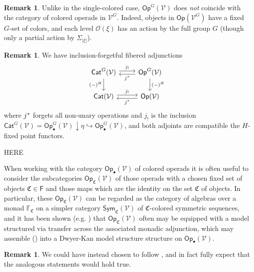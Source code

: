 \documentclass[a4paper,10pt
,draft
]{article}%
\numberwithin{equation}{section}
\numberwithin{figure}{section}
\theoremstyle{definition} %
\newtheorem{remark}[equation]{Remark}%
\newcommand{\into}{\hookrightarrow}%
\newcommand{\Cat}{\mathsf{Cat}}
\newcommand{\Op}{\mathsf{Op}}%
\newcommand{\V}{\ensuremath{\mathcal V}}
\renewcommand{\O}{\ensuremath{\mathcal O}}
\newcommand{\1}{\ensuremath{\mathbbm 1}}%
\begin{document}
\begin{remark}
      Unlike in the single-colored case, $\Op^G(\V)$ does \textit{not} coincide with the category of colored operads in $\V^G$.
      Indeed, objects in $\Op(\V^G)$ have a fixed $G$-set of colors,
      and each level $\O(\xi)$ has an action by the full group $G$
      (though only a partial action by $\Sigma_{|\xi|}$).
\end{remark}



\begin{remark}
We have inclusion-forgetful fibered adjunctions
\begin{equation}\label{JSTAR_CAT_EQ}
\begin{tikzcd}
	\Cat^{G}(\V)
	\arrow[shift left]{r}{j_!}
	\arrow[d, "{(-)^H}"']
&
	\Op^{G}(\V)
	\arrow[shift left]{l}{j^{\**}}
	\arrow{d}{(-)^H}
\\
	\Cat(\V)
	\arrow[shift left]{r}{j_!}
&
	\Op(\V)
	\arrow[shift left]{l}{j^{\**}}
\end{tikzcd}
\end{equation}
where $j^{\**}$ forgets all non-unary operations and
$j_!$ is the inclusion $\Cat^G(\V) = \Op^G_\bullet(\V) \downarrow \eta \into \Op^G_\bullet(\V)$,
and both adjoints are compatible the $H$-fixed point functors.
\end{remark}



{\color{blue} HERE}


When working with the category $\mathsf{Op}_\bullet(\mathcal{V})$ of colored operads
it is often useful to consider the subcategories $\mathsf{Op}_{\mathfrak{C}}(\mathcal{V})$
of those operads with a chosen fixed set of objects
$\mathfrak{C} \in \mathsf{F}$ and those maps which are the identity on the set $\mathfrak{C}$ of objects.
In particular, these $\mathsf{Op}_{\mathfrak{C}}(\mathcal{V})$ can be regarded as the category of algebras over a monad 
$\mathbb{F}_{\mathfrak{C}}$ on a simpler category
$\mathsf{Sym}_{\mathfrak{C}}(\mathcal{V})$ of $\mathfrak C$-colored symmetric sequences,
and it has been shown (e.g. \cite{BM07,BB17,WY18,Cav}) that
$\mathsf{Op}_{\mathfrak{C}}(\mathcal{V})$ often may be equipped with a model structured via transfer across the associated monadic adjunction,
which may assemble (\cite{BM13,Cav,Mur15}) into a Dwyer-Kan model structure structure on $\mathsf{Op}_\bullet(\mathcal{V})$.

\begin{remark}
      We could have instead chosen to follow \cite{Mur15}, and in fact
      fully expect that the analogous statements would hold true.
\end{remark}
\end{document}
